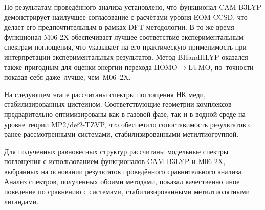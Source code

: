 \documentclass[a4paper,12pt]{article}
\newcommand{\rarr}{\rightarrow}
\begin{document}
\begin{onehalfspace}
	По результатам проведённого анализа установлено, что функционал CAM-B3LYP демонстрирует наилучшее согласование с расчётами уровня EOM-CCSD, что делает его предпочтительным в рамках DFT методологии. В то же время функционал M06-2X обеспечивает лучшее соответствие экспериментальным спектрам поглощения, что указывает на его практическую применимость при интерпретации экспериментальных результатов. Метод BHandHLYP оказался также пригодным для оценки энергии перехода HOMO$\rarr$LUMO, по точности показав себя даже лучше, чем M06–2X. 

	
	На следующем этапе рассчитаны спектры поглощения НК меди, стабилизированных цистеином. Соответствующие геометрии комплексов предварительно оптимизированы как в газовой фазе, так и в водной среде на уровне теории MP2/def2-TZVP, что обеспечило сопоставимость результатов с ранее рассмотренными системами, стабилизированными метилтиогруппой.
	
	Для полученных равновесных структур рассчитаны модельные спектры поглощения с использованием функционалов CAM-B3LYP и M06-2X, выбранных на основании результатов проведённого сравнительного анализа. Анализ спектров, полученных обоими методами, показал качественно иное поведение по сравнению с системами, стабилизированными метилтиолятными лигандами.
	

\end{onehalfspace}
\end{document}
